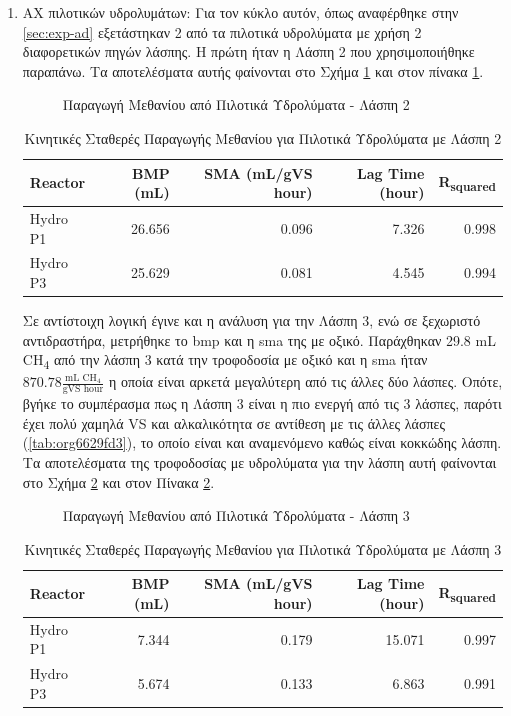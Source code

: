 \documentclass[11pt]{report}
\begin{document}
\begin{enumerate}
\item AX πιλοτικών υδρολυμάτων:
\label{sec:org87fea5b}
Για τον κύκλο αυτόν, όπως αναφέρθηκε στην \autoref{sec:exp-ad} εξετάστηκαν 2 από τα πιλοτικά υδρολύματα με χρήση 2 διαφορετικών πηγών λάσπης. Η πρώτη ήταν η Λάσπη 2 που χρησιμοποιήθηκε παραπάνω. Τα αποτελέσματα αυτής φαίνονται στο Σχήμα \ref{fig:orgd72d728} και στον πίνακα \ref{tab:orgd297a4a}.

\begin{figure}[htbp]
\centering

\caption{\label{fig:orgd72d728}Παραγωγή Μεθανίου από Πιλοτικά Υδρολύματα - Λάσπη 2}
\end{figure}

\begin{table}[htbp]
\caption{\label{tab:orgd297a4a}Κινητικές Σταθερές Παραγωγής Μεθανίου για Πιλοτικά Υδρολύματα με Λάσπη 2}
\centering
\begin{tabular}{lrrrr}
Reactor & BMP (mL) & SMA (mL/gVS hour) & Lag Time (hour) & R\textsubscript{squared}\\[0pt]
\hline
Hydro P1 & 26.656 & 0.096 & 7.326 & 0.998\\[0pt]
Hydro P3 & 25.629 & 0.081 & 4.545 & 0.994\\[0pt]
\end{tabular}
\end{table}

Σε αντίστοιχη λογική έγινε και η ανάλυση για την Λάσπη 3, ενώ σε ξεχωριστό αντιδραστήρα, μετρήθηκε το \acrshort{bmp} και η \acrshort{sma} της με οξικό. Παράχθηκαν 29.8 mL CH\textsubscript{4} από την λάσπη 3 κατά την τροφοδοσία με οξικό και η \acrshort{sma} ήταν \(870.78 \frac{\text{mL CH$_4$}}{\text{gVS hour}}\) η οποία είναι αρκετά μεγαλύτερη από τις άλλες δύο λάσπες. Οπότε, βγήκε το συμπέρασμα πως η Λάσπη 3 είναι η πιο ενεργή από τις 3 λάσπες, παρότι έχει πολύ χαμηλά VS και αλκαλικότητα σε αντίθεση με τις άλλες λάσπες (\ref{tab:org6629fd3}), το οποίο είναι και αναμενόμενο καθώς είναι κοκκώδης λάσπη. Τα αποτελέσματα της τροφοδοσίας με υδρολύματα για την λάσπη αυτή φαίνονται στο Σχήμα \ref{fig:orgde57fcc} και στον Πίνακα \ref{tab:org29cdadc}.

\begin{figure}[htbp]
\centering

\caption{\label{fig:orgde57fcc}Παραγωγή Μεθανίου από Πιλοτικά Υδρολύματα - Λάσπη 3}
\end{figure}

\begin{table}[htbp]
\caption{\label{tab:org29cdadc}Κινητικές Σταθερές Παραγωγής Μεθανίου για Πιλοτικά Υδρολύματα με Λάσπη 3}
\centering
\begin{tabular}{lrrrr}
Reactor & BMP (mL) & SMA (mL/gVS hour) & Lag Time (hour) & R\textsubscript{squared}\\[0pt]
\hline
Hydro P1 & 7.344 & 0.179 & 15.071 & 0.997\\[0pt]
Hydro P3 & 5.674 & 0.133 & 6.863 & 0.991\\[0pt]
\end{tabular}
\end{table}


\end{enumerate}
\end{document}
